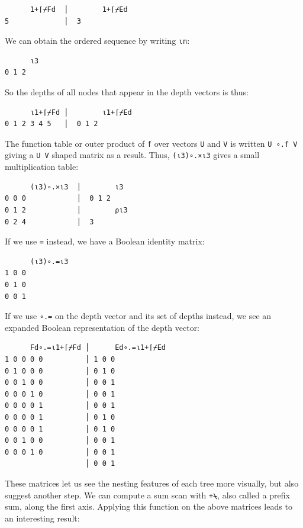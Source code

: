 ﻿\documentclass[numbers,10pt,preprint]{sigplanconf}
\begin{document}
\begin{verbatim}
      1+⌈⌿Fd  │        1+⌈⌿Ed
5             │  3
\end{verbatim}

\noindent We can obtain the ordered sequence  by writing \verb;⍳n;:

\begin{verbatim}
      ⍳3
0 1 2
\end{verbatim}

\noindent
So the depths of all nodes that appear in the depth vectors is thus:

\begin{verbatim}
      ⍳1+⌈⌿Fd │        ⍳1+⌈⌿Ed
0 1 2 3 4 5   │  0 1 2
\end{verbatim}

\noindent The function table or outer product of \verb;f; over vectors \verb;U; and \verb;V; is written \verb;U ∘.f V; giving a \verb;U V; shaped matrix as a result. Thus, \verb;(⍳3)∘.×⍳3; gives a small multiplication table:

\begin{verbatim}
      (⍳3)∘.×⍳3  │        ⍳3
0 0 0            │  0 1 2
0 1 2            │        ⍴⍳3
0 2 4            │  3
\end{verbatim}

\noindent If we use \verb;=; instead, we have a Boolean identity matrix:

\begin{verbatim}
      (⍳3)∘.=⍳3
1 0 0
0 1 0
0 0 1
\end{verbatim}

\noindent If we use \verb;∘.=; on the depth vector and its set of depths instead, we see an expanded Boolean representation of the depth vector:

\begin{verbatim}
      Fd∘.=⍳1+⌈⌿Fd │      Ed∘.=⍳1+⌈⌿Ed
1 0 0 0 0          │ 1 0 0
0 1 0 0 0          │ 0 1 0
0 0 1 0 0          │ 0 0 1
0 0 0 1 0          │ 0 0 1
0 0 0 0 1          │ 0 0 1
0 0 0 0 1          │ 0 1 0
0 0 0 0 1          │ 0 1 0
0 0 1 0 0          │ 0 0 1
0 0 0 1 0          │ 0 0 1
                   │ 0 0 1
\end{verbatim}

\noindent These matrices let us see the nesting features of each tree more visually, but also suggest another step. We can compute a sum scan with \verb;+⍀;, also called a prefix sum, along the first axis. Applying this function on the above matrices leads to an interesting result:
\end{document}
